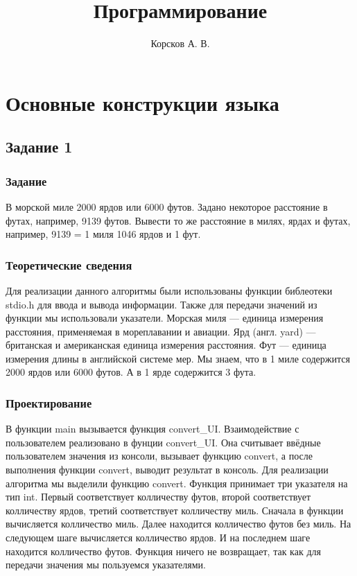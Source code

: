 \documentclass[12pt,a4paper]{report}
\author{Корсков А. В.}
\title{Программирование}
\begin{document}
\maketitle
\chapter{Основные конструкции языка}
\section{Задание 1}
\subsection{Задание}
В морской миле 2000 ярдов или 6000 футов. Задано некоторое расстояние в футах, например, 9139 футов. Вывести то же расстояние в милях, ярдах и футах, например, 9139 = 1 миля 1046 ярдов и 1 фут.
\subsection{Теоретические сведения}
Для реализации данного алгоритмы были использованы функции библеотеки stdio.h для ввода и вывода информации. Также для передачи значений из функции мы использовали указатели. 
Морская миля — единица измерения расстояния, применяемая в мореплавании и авиации. Ярд (англ. yard) — британская и американская единица измерения расстояния. Фут — единица измерения длины в английской системе мер. Мы знаем, что в 1 миле содержится 2000 ярдов или 6000 футов. А в 1 ярде содержится 3 фута.
\subsection{Проектирование}
В функции main вызывается функция convert\_UI. Взаимодействие с пользователем реализовано в фунции convert\_UI. Она считывает ввёдные пользователем значения из консоли, вызывает функцию convert, а после выполнения функции convert, выводит результат в консоль. Для реализации алгоритма мы выделили функцию convert. Функция принимает три указателя на тип int. Первый соответствует колличеству футов, второй соответствует колличеству ярдов, третий соответствует колличеству миль. Сначала в функции вычисляется колличество миль. Далее находится колличество футов без миль. На следующем шаге вычисляется колличество ярдов. И на последнем шаге находится колличество футов. Функция ничего не возвращает, так как для передачи значения мы пользуемся указателями.
\end{document}
